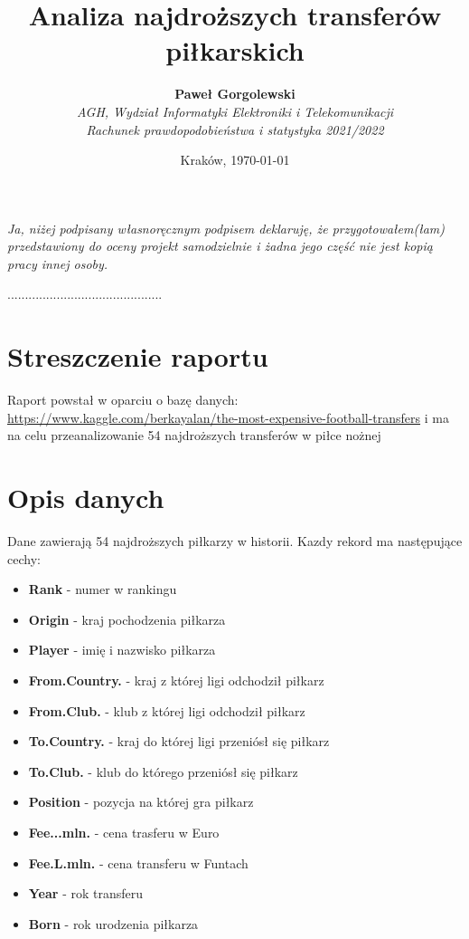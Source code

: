 \documentclass{article}
\title{Analiza najdroższych transferów piłkarskich}
\author{\textbf{Paweł Gorgolewski}\\ 
\textit{AGH, Wydział Informatyki Elektroniki i Telekomunikacji}\\
\textit{Rachunek prawdopodobieństwa i statystyka 2021/2022}}
\date{Kraków, \today}
\begin{document}
\maketitle

\textit{Ja, niżej podpisany własnoręcznym podpisem deklaruję, że przygotowałem(łam) przedstawiony do oceny projekt samodzielnie i żadna jego część nie jest kopią pracy innej osoby.}
\begin{flushright}
{............................................}
\end{flushright}

\section{Streszczenie raportu}
Raport powstał w oparciu o bazę danych: \href{url}{https://www.kaggle.com/berkayalan/the-most-expensive-football-transfers} i ma na celu przeanalizowanie 54 najdroższych transferów w piłce nożnej

\section{Opis danych}
Dane zawierają 54 najdroższych piłkarzy w historii. Kazdy rekord ma następujące cechy:
\begin{itemize}
    \item \textbf{Rank} - numer w rankingu
    \item \textbf{Origin} - kraj pochodzenia piłkarza
    \item \textbf{Player} - imię i nazwisko piłkarza
    \item \textbf{From.Country.} - kraj z której ligi odchodził piłkarz
    \item \textbf{From.Club.} - klub z której ligi odchodził piłkarz
    \item \textbf{To.Country.} - kraj do której ligi przeniósł się piłkarz
    \item \textbf{To.Club.} - klub do którego przeniósł się piłkarz
    \item \textbf{Position} - pozycja na której gra piłkarz
    \item \textbf{Fee...mln.} - cena trasferu w Euro
    \item \textbf{Fee.L.mln.} - cena transferu w Funtach
    \item \textbf{Year} - rok transferu
    \item \textbf{Born} - rok urodzenia piłkarza
\end{itemize}
\end{document}
